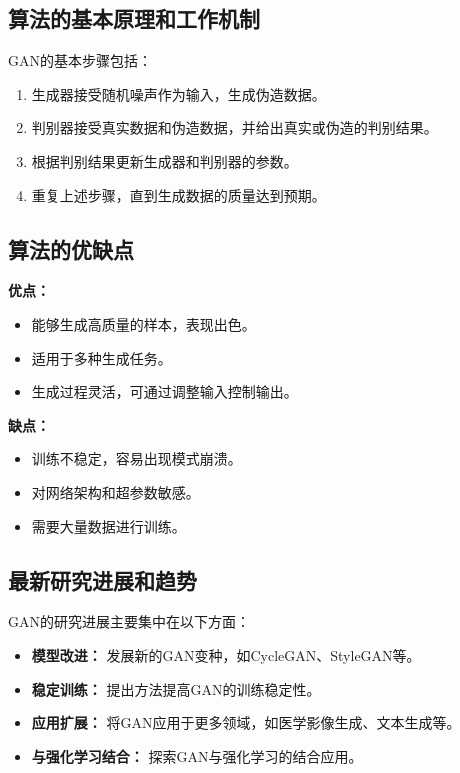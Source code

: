 \subsection*{算法的基本原理和工作机制}
GAN的基本步骤包括：
\begin{enumerate}
    \item 生成器接受随机噪声作为输入，生成伪造数据。
    \item 判别器接受真实数据和伪造数据，并给出真实或伪造的判别结果。
    \item 根据判别结果更新生成器和判别器的参数。
    \item 重复上述步骤，直到生成数据的质量达到预期。
\end{enumerate}

\subsection*{算法的优缺点}
\textbf{优点：}
\begin{itemize}
    \item 能够生成高质量的样本，表现出色。
    \item 适用于多种生成任务。
    \item 生成过程灵活，可通过调整输入控制输出。
\end{itemize}

\textbf{缺点：}
\begin{itemize}
    \item 训练不稳定，容易出现模式崩溃。
    \item 对网络架构和超参数敏感。
    \item 需要大量数据进行训练。
\end{itemize}

\subsection*{最新研究进展和趋势}
GAN的研究进展主要集中在以下方面：
\begin{itemize}
    \item \textbf{模型改进：} 发展新的GAN变种，如CycleGAN、StyleGAN等。
    \item \textbf{稳定训练：} 提出方法提高GAN的训练稳定性。
    \item \textbf{应用扩展：} 将GAN应用于更多领域，如医学影像生成、文本生成等。
    \item \textbf{与强化学习结合：} 探索GAN与强化学习的结合应用。
\end{itemize}
